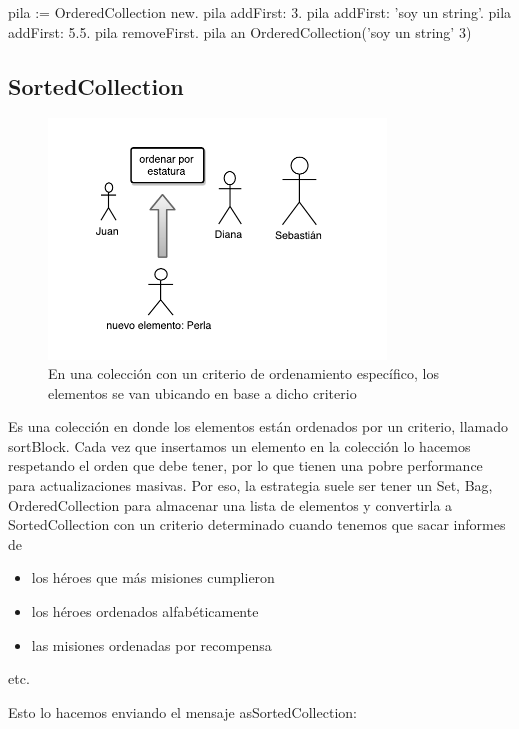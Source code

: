 \documentclass[a4paper,12pt]{book}
\begin{document}
\begin{code}
pila := OrderedCollection new.
pila addFirst: 3.
pila addFirst: 'soy un string'.
pila addFirst: 5.5.
pila removeFirst.
pila
  an OrderedCollection('soy un string' 3)
\end{code}


\subsection{SortedCollection}

\begin{figure}[h!]
    \centering
    \includegraphics[width=0.8\textwidth]{images/40_SortedCollection.pdf}
    \caption{En una colección con un criterio de ordenamiento específico, los elementos se van ubicando en base a dicho criterio}
\end{figure}
\FloatBarrier

Es una colección en donde los elementos están ordenados por un criterio, llamado sortBlock. Cada vez que
insertamos un elemento en la colección lo hacemos respetando el orden que debe tener, por lo que tienen
una pobre performance para actualizaciones masivas. Por eso, la estrategia suele ser tener un Set, Bag,
OrderedCollection para almacenar una lista de elementos y convertirla a SortedCollection con un criterio
determinado cuando tenemos que sacar informes de

\begin{itemize}
 \item los héroes que más misiones cumplieron
 \item los héroes ordenados alfabéticamente
 \item las misiones ordenadas por recompensa
\end{itemize}
etc. 

Esto lo hacemos enviando el mensaje asSortedCollection:
\end{document}
